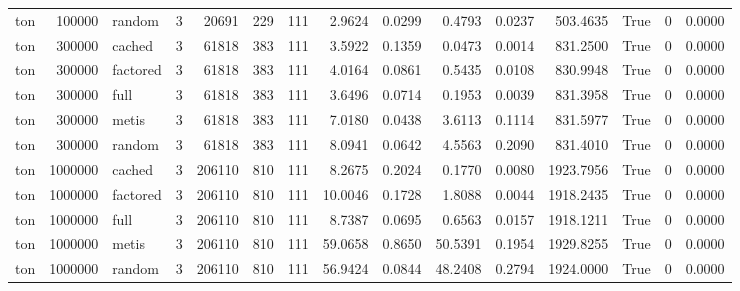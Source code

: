 \begin{tabular}{lrlrrrrrrrrrrrr}
ton & 100000 & random & 3 & 20691 & 229 & 111 & 2.9624 & 0.0299 & 0.4793 & 0.0237 & 503.4635 & True & 0 & 0.0000 \\
ton & 300000 & cached & 3 & 61818 & 383 & 111 & 3.5922 & 0.1359 & 0.0473 & 0.0014 & 831.2500 & True & 0 & 0.0000 \\
ton & 300000 & factored & 3 & 61818 & 383 & 111 & 4.0164 & 0.0861 & 0.5435 & 0.0108 & 830.9948 & True & 0 & 0.0000 \\
ton & 300000 & full & 3 & 61818 & 383 & 111 & 3.6496 & 0.0714 & 0.1953 & 0.0039 & 831.3958 & True & 0 & 0.0000 \\
ton & 300000 & metis & 3 & 61818 & 383 & 111 & 7.0180 & 0.0438 & 3.6113 & 0.1114 & 831.5977 & True & 0 & 0.0000 \\
ton & 300000 & random & 3 & 61818 & 383 & 111 & 8.0941 & 0.0642 & 4.5563 & 0.2090 & 831.4010 & True & 0 & 0.0000 \\
ton & 1000000 & cached & 3 & 206110 & 810 & 111 & 8.2675 & 0.2024 & 0.1770 & 0.0080 & 1923.7956 & True & 0 & 0.0000 \\
ton & 1000000 & factored & 3 & 206110 & 810 & 111 & 10.0046 & 0.1728 & 1.8088 & 0.0044 & 1918.2435 & True & 0 & 0.0000 \\
ton & 1000000 & full & 3 & 206110 & 810 & 111 & 8.7387 & 0.0695 & 0.6563 & 0.0157 & 1918.1211 & True & 0 & 0.0000 \\
ton & 1000000 & metis & 3 & 206110 & 810 & 111 & 59.0658 & 0.8650 & 50.5391 & 0.1954 & 1929.8255 & True & 0 & 0.0000 \\
ton & 1000000 & random & 3 & 206110 & 810 & 111 & 56.9424 & 0.0844 & 48.2408 & 0.2794 & 1924.0000 & True & 0 & 0.0000 \\
\bottomrule
\end{tabular}
